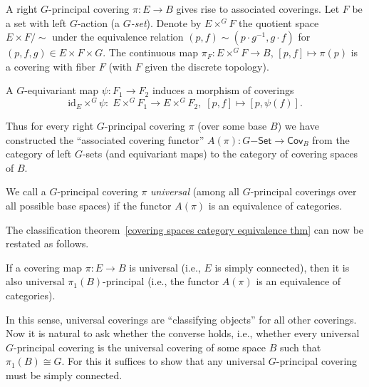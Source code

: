 \begin{defn}
    A right $G$-principal covering $\pi:E\to B$ gives rise to associated coverings. Let $F$ be a set with left $G$-action (a \emph{$G$-set}). Denote by $E\times^G F$ the quotient space $E\times F\slash \sim $ under the equivalence relation $(p,f)\sim(p\cdot g^{-1},g\cdot f)$ for $(p,f,g)\in E\times F\times G$. The continuous map $\pi_F:E\times^G F\to B$, $[p,f]\mapsto \pi(p)$ is a covering with fiber $F$ (with $F$ given the discrete topology).

    A $G$-equivariant map $\psi:F_1\to F_2$ induces a morphism of coverings
    \[\mathrm{id}_E\times^G\psi: \; E\times^G F_1\to E \times^G F_2,\; [p,f]\mapsto [p,\psi(f)].\]
\end{defn}

Thus for every right $G$-principal covering $\pi$ (over some base $B$) we have constructed the ``associated covering functor'' $A(\pi):G\mathsf{-Set}\to \mathsf{Cov}_B$ from the category of left $G$-sets (and equivariant maps) to the category of covering spaces of $B$. 

\begin{defn}
    We call a $G$-principal covering $\pi$ \textit{universal} (among all $G$-principal coverings over all possible base spaces) if the functor $A(\pi)$ is an equivalence of categories.
\end{defn}

The classification theorem~\ref{covering spaces category equivalence thm} can now be restated as follows.
\begin{thm}\label{thm classification of coverings iii}
     If a covering map $\pi:E\to B$ is universal (i.e., $E$ is simply connected), then it is also universal $\pi_1(B)$-principal (i.e., the functor $A(\pi)$ is an equivalence of categories).
\end{thm}

In this sense, universal coverings are ``classifying objects'' for all other coverings. Now it is natural to ask whether the converse holds, i.e., whether every universal $G$-principal covering is the universal covering of some space $B$ such that $\pi_1(B)\cong G$. For this it suffices to show that any universal $G$-principal covering must be simply connected.

